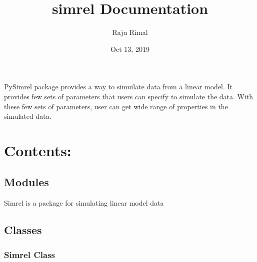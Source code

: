 \documentclass[letterpaper,10pt,english]{sphinxmanual}
\title{simrel Documentation}
\date{Oct 13, 2019}
\author{Raju Rimal}
\begin{document}
\pagestyle{empty}
\sphinxmaketitle
\pagestyle{plain}
\sphinxtableofcontents
\pagestyle{normal}
\label{\detokenize{index::doc}}


PySimrel package provides a way to simuilate data from a linear model. It provides few sets of parameters that users can specify to simulate the data. With these few sets of parameters, user can get wide range of properties in the simulated data.


\chapter{Contents:}
\label{\detokenize{index:contents}}

\section{Modules}
\label{\detokenize{Modules:module-pysimrel}}\label{\detokenize{Modules:modules}}\label{\detokenize{Modules::doc}}
Simrel is a package for simulating linear model data


\section{Classes}
\label{\detokenize{Classes:classes}}\label{\detokenize{Classes::doc}}

\subsection{Simrel Class}
\label{\detokenize{Classes:simrel-class}}
\end{document}
